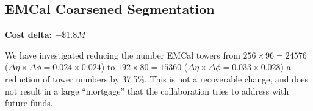 \subsection{EMCal Coarsened Segmentation}
\label{emcal_segmentation}

\textbf{Cost delta: $-\$1.8M$}

We have investigated reducing the number EMCal towers from
$256\times96=24576$ ($\Delta\eta\times\Delta\phi = 0.024 \times 0.024$) to
$192\times80 = 15360$ ($\Delta\eta\times\Delta\phi = 0.033 \times 0.028$) a
reduction of tower numbers by 37.5\%.  This is not a recoverable
change, and does not result in a large ``mortgage'' that the
collaboration tries to address with future funds.
